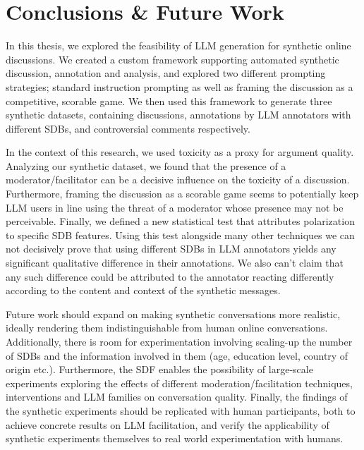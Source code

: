 %
\chapter{Conclusions \& Future Work}
\label{sec:conclusions}

In this thesis, we explored the feasibility of LLM generation for synthetic online discussions. We created a custom framework supporting automated synthetic discussion, annotation and analysis, and explored two different prompting strategies; standard instruction prompting as well as framing the discussion as a competitive, scorable game. We then used this framework to generate three synthetic datasets, containing discussions, annotations by LLM annotators with different \acp{SDB}, and controversial comments respectively. 

In the context of this research, we used toxicity as a proxy for argument quality. Analyzing our synthetic dataset, we found that the presence of a moderator/facilitator can be a decisive influence on the toxicity of a discussion. Furthermore, framing the discussion as a scorable game seems to potentially keep LLM users in line using the threat of a moderator whose presence may not be perceivable. Finally, we defined a new statistical test that attributes polarization to specific \ac{SDB} features. Using this test alongside many other techniques we can not decisively prove that using different \acp{SDB} in LLM annotators yields any significant qualitative difference in their annotations. We also can't claim that any such difference could be attributed to the annotator reacting differently according to the content and context of the synthetic messages.

Future work should expand on making synthetic conversations more realistic, ideally rendering them indistinguishable from human online conversations. Additionally, there is room for experimentation involving scaling-up the number of \acp{SDB} and the information involved in them (age, education level, country of origin etc.). Furthermore, the \ac{SDF} enables the possibility of large-scale experiments exploring the effects of different moderation/facilitation techniques, interventions and LLM families on conversation quality. Finally, the findings of the synthetic experiments should be replicated with human participants, both to achieve concrete results on LLM facilitation, and verify the applicability of synthetic experiments themselves to real world experimentation with humans.